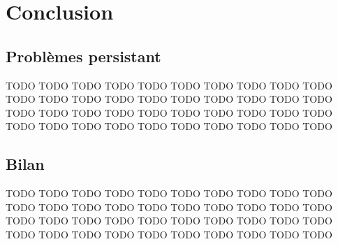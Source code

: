 \chapter{Conclusion}\label{chap:COnc}

\section{Problèmes persistant}
 TODO TODO TODO TODO TODO TODO TODO TODO TODO TODO TODO TODO TODO TODO TODO TODO TODO TODO
 TODO TODO TODO TODO TODO TODO TODO TODO TODO TODO TODO TODO TODO TODO TODO TODO TODO TODO TODO TODO TODO TODO

\section{Bilan}
 TODO TODO TODO TODO TODO TODO TODO TODO TODO TODO TODO TODO TODO TODO TODO TODO TODO TODO
 TODO TODO TODO TODO TODO TODO TODO TODO TODO TODO TODO TODO TODO TODO TODO TODO TODO TODO TODO TODO TODO TODO


